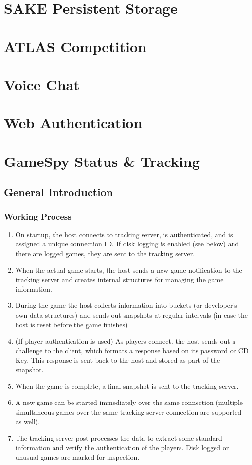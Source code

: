 \documentclass[oneside,titlepage,a4paper]{Definition/retrospy} %
\begin{document}
\part{SAKE Persistent Storage}
\part{ATLAS Competition}
\part{Voice Chat}
\part{Web Authentication}

\part{GameSpy Status \& Tracking}
\chapter{General Introduction}
\section{Working Process}
\begin{enumerate}
	\item On startup, the host connects to tracking server, is authenticated, and is assigned a unique connection ID. If disk logging is enabled (see below) and there are logged games, they are sent to the tracking server. 
	\item When the actual game starts, the host sends a new game notification to the tracking server and creates internal structures for managing the game information. 
	\item During the game the host collects information into buckets (or developer's own data structures) and sends out snapshots at regular intervals (in case the host is reset before the game finishes) 
	\item (If player authentication is used) As players connect, the host sends out a challenge to the client, which formats a response based on its password or CD Key. This response is sent back to the host and stored as part of the snapshot. 
	\item When the game is complete, a final snapshot is sent to the tracking server. 
	\item A new game can be started immediately over the same connection (multiple simultaneous games over the same tracking server connection are supported as well). 
	\item The tracking server post-processes the data to extract some standard information and verify the authentication of the players. Disk logged or unusual games are marked for inspection. 
\end{enumerate}
\end{document}
